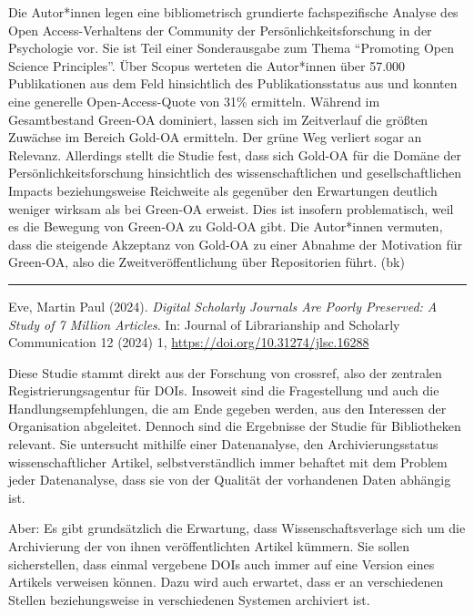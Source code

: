 \documentclass[a4paper,
fontsize=11pt,
oneside,
numbers=noperiodatend,
parskip=half-,
bibliography=totoc,
final
]{scrartcl}
\begin{document}
Die Autor*innen legen eine bibliometrisch grundierte fachspezifische
Analyse des Open Access-Verhaltens der Community der
Persönlichkeitsforschung in der Psychologie vor. Sie ist Teil einer
Sonderausgabe zum Thema \enquote{Promoting Open Science Principles}.
Über Scopus werteten die Autor*innen über 57.000 Publikationen aus dem
Feld hinsichtlich des Publikationsstatus aus und konnten eine generelle
Open-Access-Quote von 31\% ermitteln. Während im Gesamtbestand Green-OA
dominiert, lassen sich im Zeitverlauf die größten Zuwächse im Bereich
Gold-OA ermitteln. Der grüne Weg verliert sogar an Relevanz. Allerdings
stellt die Studie fest, dass sich Gold-OA für die Domäne der
Persönlichkeitsforschung hinsichtlich des wissenschaftlichen und
gesellschaftlichen Impacts beziehungsweise Reichweite als gegenüber den
Erwartungen deutlich weniger wirksam als bei Green-OA erweist. Dies ist
insofern problematisch, weil es die Bewegung von Green-OA zu Gold-OA
gibt. Die Autor*innen vermuten, dass die steigende Akzeptanz von Gold-OA
zu einer Abnahme der Motivation für Green-OA, also die
Zweitveröffentlichung über Repositorien führt. (bk)

\begin{center}\rule{0.5\linewidth}{0.5pt}\end{center}

Eve, Martin Paul (2024). \emph{Digital Scholarly Journals Are Poorly
Preserved: A Study of 7 Million Articles}. In: Journal of Librarianship
and Scholarly Communication 12 (2024) 1,
\url{https://doi.org/10.31274/jlsc.16288}

Diese Studie stammt direkt aus der Forschung von crossref, also der
zentralen Registrierungsagentur für DOIs. Insoweit sind die
Fragestellung und auch die Handlungsempfehlungen, die am Ende gegeben
werden, aus den Interessen der Organisation abgeleitet. Dennoch sind die
Ergebnisse der Studie für Bibliotheken relevant. Sie untersucht mithilfe
einer Datenanalyse, den Archivierungsstatus wissenschaftlicher Artikel,
selbstverständlich immer behaftet mit dem Problem jeder Datenanalyse,
dass sie von der Qualität der vorhandenen Daten abhängig ist.

Aber: Es gibt grundsätzlich die Erwartung, dass Wissenschaftsverlage
sich um die Archivierung der von ihnen veröffentlichten Artikel kümmern.
Sie sollen sicherstellen, dass einmal vergebene DOIs auch immer auf eine
Version eines Artikels verweisen können. Dazu wird auch erwartet, dass
er an verschiedenen Stellen beziehungsweise in verschiedenen Systemen
archiviert ist.
\end{document}
